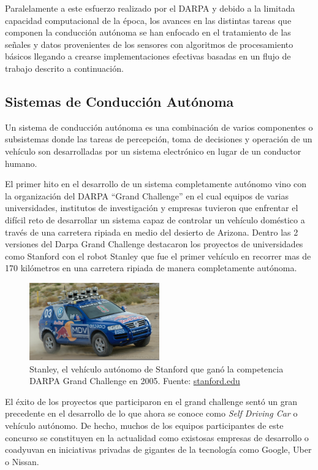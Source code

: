 \documentclass[12pt,letterpaper]{article}
\begin{document}
Paralelamente a este esfuerzo realizado por el DARPA y debido a la limitada capacidad computacional de la época, 
los avances en las distintas tareas que componen la conducción autónoma se han enfocado en el tratamiento de las señales 
y datos provenientes de los sensores con algoritmos de procesamiento básicos llegando a crearse implementaciones efectivas 
basadas en un flujo de trabajo descrito a continuación.

\subsection{Sistemas de Conducción Autónoma}
Un sistema de conducción autónoma es una combinación de varios componentes o subsistemas donde las tareas 
de percepción, toma de decisiones y operación de un vehículo son desarrolladas por un sistema electrónico en lugar
de un conductor humano. 

El primer hito en el desarrollo de un sistema completamente autónomo vino 
con la organización del DARPA “Grand Challenge” en el cual equipos de varias universidades, 
institutos de investigación y empresas tuvieron que enfrentar el difícil reto de desarrollar 
un sistema capaz de controlar un vehículo doméstico a través de una carretera 
ripiada en medio del desierto de Arizona. Dentro las 2 versiones del Darpa Grand Challenge 
destacaron los proyectos de universidades como Stanford con el robot Stanley \cite{Thrun2006} que fue el primer 
vehículo en recorrer mas de 170 kilómetros en una carretera ripiada de manera completamente autónoma. 


\begin{figure}[!h] 
\centering
\includegraphics[width=0.5\textwidth]{stanley1}
\caption{Stanley, el vehículo autónomo de Stanford que ganó la competencia DARPA Grand Challenge en 2005. 
        Fuente: \href{http://stanford.edu/~cpiech/cs221/apps/driverlessCar.html}{stanford.edu} }
\label{fig:stanley1}
\end{figure}

El éxito de los proyectos que participaron en el grand challenge sentó un gran precedente en el desarrollo de lo que 
ahora se conoce como \textit{Self Driving Car} o vehículo autónomo. De hecho, muchos de los equipos 
participantes de este concurso se constituyen en la actualidad como existosas empresas de desarrollo o 
coadyuvan en iniciativas privadas de gigantes de la tecnología como Google, Uber o Nissan.
\end{document}
